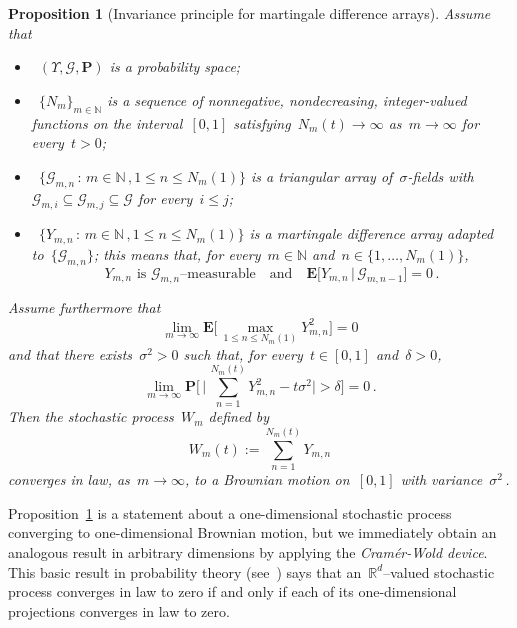 \documentclass[11pt,twoside]{article} %
\numberwithin{equation}{section}
\newtheorem{proposition}[theorem]{Proposition}
\theoremstyle{definition}
\newcommand*{\N}{\ensuremath{\mathbb{N}}}
\newcommand*{\Rd}{\ensuremath{\mathbb{R}^d}}
\begin{document}
\begin{proposition}[Invariance principle for martingale difference arrays]
\label{p.MFCLT}
Assume that 
\begin{itemize}

\item~$(\Upsilon, \mathcal{G},\mathbf{P})$ is a probability space;

\item~$\{ N_m \}_{m\in\N}$ is a sequence of nonnegative, nondecreasing, integer-valued functions on the interval~$[0,1]$ satisfying~$N_m(t) \to \infty$ as~$m\to \infty$ for every~$t>0$;

\item~$\{ \mathcal{G}_{m,n} \,:\, m\in\N\,,  1 \leq n \leq N_m(1) \}$ is a triangular array of~$\sigma$-fields with~$\mathcal{G}_{m,i} \subseteq \mathcal{G}_{m,j} \subseteq \mathcal{G}$ for every~$i \leq j$;

\item~$\{ Y_{m,n} \,:\, m\in\N\,,  1 \leq n \leq N_m(1) \}$ is a martingale difference array adapted to~$\{ \mathcal{G}_{m,n} \}$; this means that, for every~$m\in\N$ and~$n\in\{1,\ldots,N_m(1) \}$, 
\begin{equation}
\label{e.MDA}
\mbox{$Y_{m,n}$ is~$\mathcal{G}_{m,n}$--measurable} 
\quad \mbox{and} \quad
\mbox{$\mathbf{E} \bigl[ Y_{m,n} \,|\, \mathcal{G}_{m,n-1} \bigr] = 0$}\,.
\end{equation}
\end{itemize}
Assume furthermore that
\begin{equation}
\label{e.invcond2}
\lim_{m\to \infty} 
\mathbf{E} \biggl[ \,
\max_{1\leq n \leq N_m(1)} 
Y_{m,n}^2
\biggr] = 0
\end{equation}
and that there exists~$\sigma^2>0$ such that, for every~$t \in [0,1]$ and~$\delta>0$,
\begin{equation}
\label{e.invcond1}
\lim_{m\to \infty} 
\mathbf{P} \Biggl[ \,
\biggl| \,
\sum_{n=1}^{N_m(t) }
Y_{m,n}^2 
- t\sigma^2
\biggr| > \delta
\Biggr] = 0\,.
\end{equation}
Then the stochastic process~$W_m$ defined by
\begin{equation*}
W_{m} (t) := \sum_{n=1}^{N_m(t)} Y_{m,n} 
\end{equation*}
converges in law, as~$m\to \infty$, to a Brownian motion on~$[0,1]$ with variance~$\sigma^2$\,.
\end{proposition}

Proposition~\ref{p.MFCLT} is a statement about a one-dimensional stochastic process converging to one-dimensional Brownian motion, but we immediately obtain an analogous result in arbitrary dimensions by applying the \emph{Cram\'er-Wold device}. This basic result in probability theory (see~\cite[Theorem 29.4]{Bill}) says that an~$\Rd$--valued stochastic process converges in law to zero if and only if each of its one-dimensional projections converges in law to zero.
\end{document}
